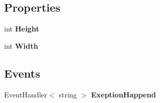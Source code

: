\subsection*{Properties}
\begin{DoxyCompactItemize}
\item 
\mbox{\label{class_home_work_1_1_task_library_1_1_tasks_1_1_lesson6_1_1_task2_1_1_classes_1_1_rectangle_a96592a8c1f78ab31dc6a83c27905755f}} 
int {\bfseries Height}
\item 
\mbox{\label{class_home_work_1_1_task_library_1_1_tasks_1_1_lesson6_1_1_task2_1_1_classes_1_1_rectangle_ae19fd3d8ce98c3724c778a7a67e6db58}} 
int {\bfseries Width}
\end{DoxyCompactItemize}
\subsection*{Events}
\begin{DoxyCompactItemize}
\item 
\mbox{\label{class_home_work_1_1_task_library_1_1_tasks_1_1_lesson6_1_1_task2_1_1_classes_1_1_rectangle_aeb106f61ed1e6924ef7afd662c9d1d36}} 
Event\+Handler$<$ string $>$ {\bfseries Exeption\+Happend}
\end{DoxyCompactItemize}
